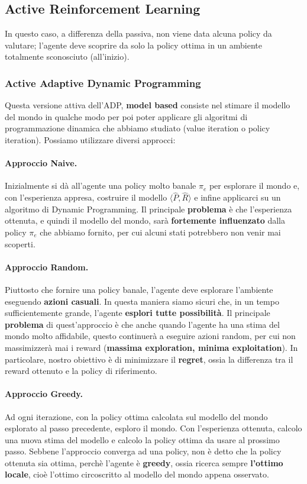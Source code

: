 \subsection{Active Reinforcement Learning}
In questo caso, a differenza della passiva, non viene data alcuna policy da valutare; l'agente deve scoprire da solo la policy
ottima in un ambiente totalmente sconosciuto (all'inizio).

\subsubsection{Active Adaptive Dynamic Programming}
Questa versione attiva dell'ADP, \textbf{model based} consiste nel stimare il modello del mondo in qualche modo per poi poter applicare gli algoritmi
di programmazione dinamica che abbiamo studiato (value iteration o policy iteration). Possiamo utilizzare diversi approcci:

\paragraph{Approccio Naive.}Inizialmente si dà all'agente una policy molto banale $\pi_e$ per esplorare il mondo e, con l'esperienza appresa,
costruire il modello $\langle \widehat{P},\widehat{R} \rangle$ e infine applicarci su un algoritmo di Dynamic Programming. Il
principale \textbf{problema} è che l'esperienza ottenuta, e quindi il modello del mondo, sarà \textbf{fortemente influenzato}
dalla policy $\pi_e$ che abbiamo fornito, per cui alcuni stati potrebbero non venir mai scoperti.

\paragraph{Approccio Random.}Piuttosto che fornire una policy banale, l'agente deve esplorare l'ambiente eseguendo \textbf{azioni casuali}.
In questa maniera siamo sicuri che, in un tempo sufficientemente grande, l'agente \textbf{esplori tutte possibilità}. Il principale
\textbf{problema} di quest'approccio è che anche quando l'agente ha una stima del mondo molto affidabile, questo continuerà a
eseguire azioni random, per cui non massimizzerà mai i reward (\textbf{massima exploration, minima exploitation}). In particolare,
nostro obiettivo è di minimizzare il \textbf{regret}, ossia la differenza tra il reward ottenuto e la policy di riferimento.

\paragraph{Approccio Greedy.}
Ad ogni iterazione, con la policy ottima calcolata sul modello del mondo esplorato al passo precedente, esploro il mondo. Con l'esperienza
ottenuta, calcolo una nuova stima del modello e calcolo la policy ottima da usare al prossimo passo. Sebbene l'approccio
converga ad una policy, non è detto che la policy ottenuta sia ottima, perchè l'agente è \textbf{greedy}, ossia ricerca sempre
\textbf{l'ottimo locale}, cioè l'ottimo circoscritto al modello del mondo appena osservato.

